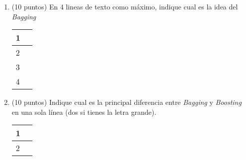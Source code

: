 \documentclass[11pt]{article}
\begin{document}
\begin{enumerate}
    \item (10 puntos) En 4 lineas de texto como máximo, indique cual es la idea del \emph{Bagging}

    \begin{center}
    \begin{tabular}{l p{16cm}}
    1 & \\
    \hline
    2 & \\
    \hline
    3 & \\
    \hline
    4 & \\
    \hline
    \end{tabular}
    \end{center}
    
    \item (10 puntos) Indique cual es la principal diferencia entre \emph{Bagging} y \emph{Boosting} en una sola línea (dos si tienes la letra grande).
    
    \begin{center}
    \begin{tabular}{l p{16cm}}
    1 & \\
    \hline
    2 & \\
    \hline
    \end{tabular}
    \end{center}
\end{enumerate}
\end{document}
